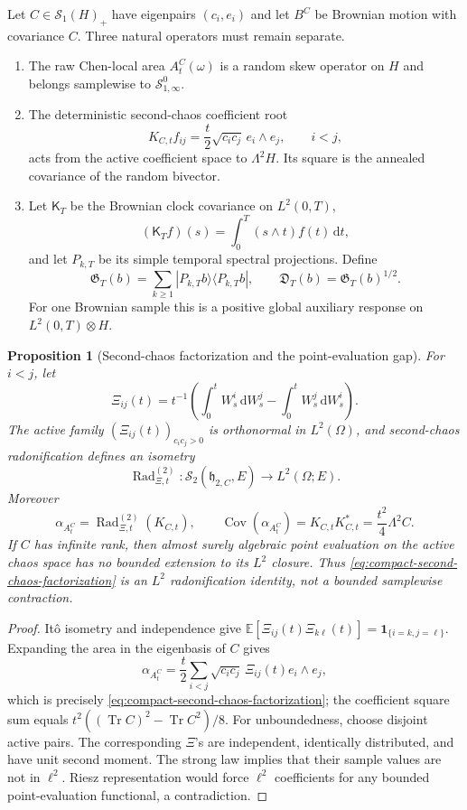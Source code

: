 \documentclass[10pt,reqno]{amsart}
\theoremstyle{plain}
\newtheorem{proposition}[theorem]{Proposition}
\theoremstyle{definition}
\theoremstyle{remark}
\begin{document}
Let $C\in\mathcal S_1(H)_+$ have eigenpairs $(c_i,e_i)$ and let $B^C$ be
Brownian motion with covariance $C$.  Three natural operators must remain
separate.
\begin{enumerate}[label=\textup{(\roman*)},leftmargin=2.8em]
\item The raw Chen-local area $A_t^C(\omega)$ is a random skew operator on
      $H$ and belongs samplewise to $\mathcal S^0_{1,\infty}$.
\item The deterministic second-chaos coefficient root
\[
 K_{C,t}f_{ij}=\frac t2\sqrt{c_ic_j}\,e_i\wedge e_j,
 \qquad i<j,
\]
acts from the active coefficient space to $\Lambda^2H$.  Its square is the
annealed covariance of the random bivector.
\item Let $\mathsf K_T$ be the Brownian clock covariance on $L^2(0,T)$,
\[
 (\mathsf K_Tf)(s)=\int_0^T(s\wedge t)f(t)\,\mathrm dt,
\]
and let $P_{k,T}$ be its simple temporal spectral projections.  Define
\[
 \mathfrak G_T(b)=\sum_{k\ge1}|P_{k,T}b\rangle\langle P_{k,T}b|,
 \qquad
 \mathfrak D_T(b)=\mathfrak G_T(b)^{1/2}.
\]
For one Brownian sample this is a positive global auxiliary response on
$L^2(0,T)\otimes H$.
\end{enumerate}


\begin{proposition}[Second-chaos factorization and the point-evaluation gap]
\label{prop:compact-brownian-factorization}
For $i<j$, let
\[
 \Xi_{ij}(t)=t^{-1}\left(
  \int_0^tW_s^i\,\mathrm dW_s^j-
  \int_0^tW_s^j\,\mathrm dW_s^i\right).
\]
The active family $(\Xi_{ij}(t))_{c_ic_j>0}$ is orthonormal in
$L^2(\Omega)$, and second-chaos radonification defines an isometry
\[
 \operatorname{Rad}^{(2)}_{\Xi,t}:
 \mathcal S_2(\mathfrak h_{2,C},E)\longrightarrow L^2(\Omega;E).
\]
Moreover
\begin{equation}
 \alpha_{A_t^C}
 =\operatorname{Rad}^{(2)}_{\Xi,t}(K_{C,t}),
 \qquad
 \operatorname{Cov}(\alpha_{A_t^C})
 =K_{C,t}K_{C,t}^*=\frac{t^2}{4}\Lambda^2C.
 \label{eq:compact-second-chaos-factorization}
\end{equation}
If $C$ has infinite rank, then almost surely algebraic point evaluation on
the active chaos space has no bounded extension to its $L^2$ closure.
Thus \eqref{eq:compact-second-chaos-factorization} is an $L^2$
radonification identity, not a bounded samplewise contraction.
\end{proposition}

\begin{proof}
It\^o isometry and independence give
$\mathbb E[\Xi_{ij}(t)\Xi_{k\ell}(t)]
=\mathbf1_{\{i=k,j=\ell\}}$.  Expanding the area in the eigenbasis of $C$
gives
\[
 \alpha_{A_t^C}
 =\frac t2\sum_{i<j}\sqrt{c_ic_j}\,\Xi_{ij}(t)e_i\wedge e_j,
\]
which is precisely \eqref{eq:compact-second-chaos-factorization}; the
coefficient square sum equals
$t^2((\operatorname{Tr}C)^2-\operatorname{Tr}C^2)/8$.
For unboundedness, choose disjoint active pairs.  The corresponding
$\Xi$'s are independent, identically distributed, and have unit second
moment.  The strong law implies that their sample values are not in
$\ell^2$.  Riesz representation would force $\ell^2$ coefficients for any
bounded point-evaluation functional, a contradiction.
\end{proof}
\end{document}
